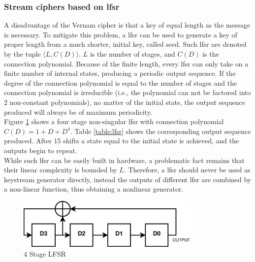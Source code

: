 \subsubsection{Stream ciphers based on \gls{lfsr}}

A disadvantage of the Vernam cipher is that a key of equal length as the message is necessary. To mitigate this problem, a \gls{lfsr} can be used to generate
a key of proper length from a much shorter, initial key, called seed. Such \gls{lfsr} are denoted by the tuple $\langle L, C(D) \rangle$. $L$ is the number of stages, and $C(D)$ is the
connection polynomial. Because of the finite length, every \gls{lfsr} can only take on a finite number of internal states, producing
a periodic output sequence.
If the degree of the connection polynomial is equal to the number of stages and the connection polynomial is irreducible (i.e., the polynomial can not
be factored into 2 non-constant polynomials), no matter of the initial state, the output sequence produced will always be of maximum periodicity.
\\
Figure \ref{fig:lsfr} shows a four stage non-singular \gls{lfsr} with connection polynomial $C(D) = 1 + D + D^4$. 
Table \ref{table:lfsr} \cite{handbookLFSR} shows the corresponding output sequence produced. After
15 shifts a state equal to the initial state is achieved, and the outputs
begin to repeat.
\\
While such \gls{lfsr} can be easily built in hardware, a problematic fact remains that their linear complexity is bounded by $L$. Therefore, a \gls{lfsr}
should never be used as keystream generator directly, instead the outputs of different \gls{lfsr} are combined by a non-linear function, thus obtaining a
nonlinear generator.
\begin{figure}
    \centering
    \includegraphics[width=0.8\textwidth]{figures/LSFR.eps}
    \caption{4 Stage LFSR}
    \label{fig:lsfr}
\end{figure}
